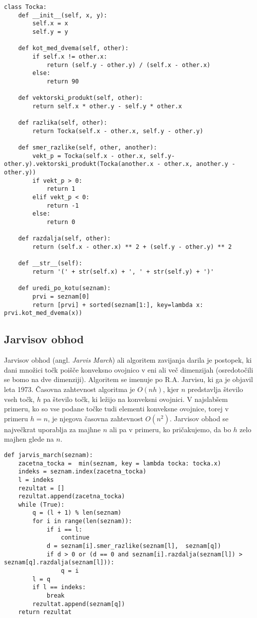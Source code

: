\documentclass[a4paper]{article}
\begin{document}
\begin{lstlisting}
class Tocka:
    def __init__(self, x, y):
        self.x = x
        self.y = y

    def kot_med_dvema(self, other):
        if self.x != other.x:
            return (self.y - other.y) / (self.x - other.x)
        else:
            return 90

    def vektorski_produkt(self, other): 
        return self.x * other.y - self.y * other.x

    def razlika(self, other):
    	return Tocka(self.x - other.x, self.y - other.y)

    def smer_razlike(self, other, another):
        vekt_p = Tocka(self.x - other.x, self.y-other.y).vektorski_produkt(Tocka(another.x - other.x, another.y - other.y))
        if vekt_p > 0:
            return 1
        elif vekt_p < 0:
            return -1
        else:
            return 0
    
    def razdalja(self, other):
        return (self.x - other.x) ** 2 + (self.y - other.y) ** 2

    def __str__(self):
        return '(' + str(self.x) + ', ' + str(self.y) + ')'

    def uredi_po_kotu(seznam):
        prvi = seznam[0]
        return [prvi] + sorted(seznam[1:], key=lambda x: prvi.kot_med_dvema(x))
\end{lstlisting}

\subsection{Jarvisov obhod}
Jarvisov obhod (angl. \textit{Jarvis March}) ali algoritem zavijanja darila je postopek, ki dani množici točk poišče konveksno ovojnico v eni ali več dimenzijah (osredotočili se 
bomo na dve dimenziji). Algoritem se imenuje po R.A. Jarvisu, ki ga je objavil leta 1973. Časovna zahtevnost algoritma je $O(nh)$, kjer $n$ predstavlja število vseh točk, $h$ pa 
število točk, ki ležijo na konveksni ovojnici. V najslabšem primeru, ko so vse podane točke tudi elementi konveksne ovojnice, torej v primeru $h = n$, je njegova časovna zahtevnost 
$O(n^2)$. Jarvisov obhod se največkrat uporablja za majhne $n$ ali pa v primeru, ko pričakujemo, da bo $h$ zelo majhen glede na $n$.

\begin{lstlisting}
def jarvis_march(seznam):
    zacetna_tocka =  min(seznam, key = lambda tocka: tocka.x)
    indeks = seznam.index(zacetna_tocka)
    l = indeks
    rezultat = []
    rezultat.append(zacetna_tocka)
    while (True):
        q = (l + 1) % len(seznam)
        for i in range(len(seznam)):
            if i == l:
                continue
            d = seznam[i].smer_razlike(seznam[l],  seznam[q])
            if d > 0 or (d == 0 and seznam[i].razdalja(seznam[l]) > seznam[q].razdalja(seznam[l])):
                q = i
        l = q
        if l == indeks:
            break 
        rezultat.append(seznam[q])
    return rezultat
\end{lstlisting}
\end{document}

